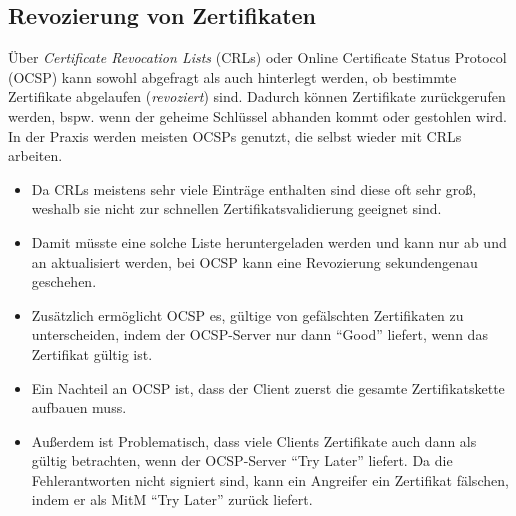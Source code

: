 	\subsection{Revozierung von Zertifikaten}
		Über \textit{Certificate Revocation Lists} (CRLs) oder Online Certificate Status Protocol (OCSP) kann sowohl abgefragt als auch hinterlegt werden, ob bestimmte Zertifikate abgelaufen (\textit{revoziert}) sind. Dadurch können Zertifikate zurückgerufen werden, bspw. wenn der geheime Schlüssel abhanden kommt oder gestohlen wird. In der Praxis werden meisten OCSPs genutzt, die selbst wieder mit CRLs arbeiten.

		\begin{itemize}
			\item Da CRLs meistens sehr viele Einträge enthalten sind diese oft sehr groß, weshalb sie nicht zur schnellen Zertifikatsvalidierung geeignet sind.
			\item Damit müsste eine solche Liste heruntergeladen werden und kann nur ab und an aktualisiert werden, bei OCSP kann eine Revozierung sekundengenau geschehen.
			\item Zusätzlich ermöglicht OCSP es, gültige von gefälschten Zertifikaten zu unterscheiden, indem der OCSP-Server nur dann \enquote{Good} liefert, wenn das Zertifikat gültig ist.
			\item Ein Nachteil an OCSP ist, dass der Client zuerst die gesamte Zertifikatskette aufbauen muss.
			\item Außerdem ist Problematisch, dass viele Clients Zertifikate auch dann als gültig betrachten, wenn der OCSP-Server \enquote{Try Later} liefert. Da die Fehlerantworten nicht signiert sind, kann ein Angreifer ein Zertifikat fälschen, indem er als MitM \enquote{Try Later} zurück liefert.
		\end{itemize}

